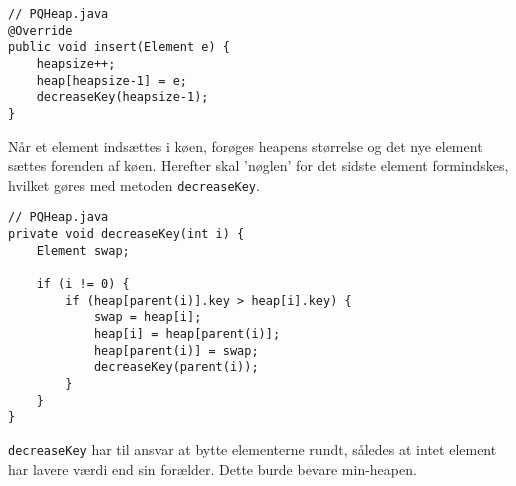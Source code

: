 \documentclass{article}
\begin{document}
\begin{lstlisting}
// PQHeap.java
@Override
public void insert(Element e) {
    heapsize++;
    heap[heapsize-1] = e;
    decreaseKey(heapsize-1);
}
\end{lstlisting}
Når et element indsættes i køen, forøges heapens størrelse og det nye element sættes forenden af køen. Herefter skal 'nøglen' for det sidste element formindskes, hvilket gøres med metoden \texttt{decreaseKey}.

\begin{lstlisting}
// PQHeap.java
private void decreaseKey(int i) {
    Element swap;

    if (i != 0) {
        if (heap[parent(i)].key > heap[i].key) {
            swap = heap[i];
            heap[i] = heap[parent(i)];
            heap[parent(i)] = swap;
            decreaseKey(parent(i));
        }
    }
}
\end{lstlisting}
\texttt{decreaseKey} har til ansvar at bytte elementerne rundt, således at intet element har lavere værdi end sin forælder. Dette burde bevare min-heapen.

\newpage
\end{document}
